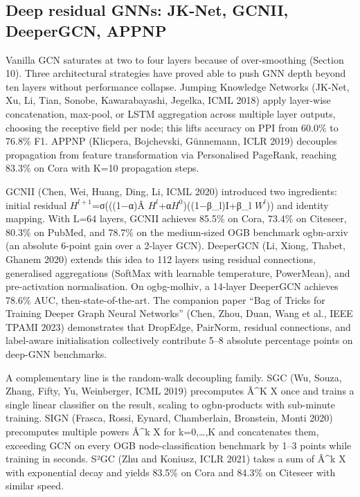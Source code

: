 \subsection{Deep residual GNNs: JK-Net, GCNII, DeeperGCN, APPNP}\label{deep-residual-gnns-jk-net-gcnii-deepergcn-appnp}

Vanilla GCN saturates at two to four layers because of over-smoothing (Section 10). Three architectural strategies have proved able to push GNN depth beyond ten layers without performance collapse. Jumping Knowledge Networks (JK-Net, Xu, Li, Tian, Sonobe, Kawarabayashi, Jegelka, ICML 2018) apply layer-wise concatenation, max-pool, or LSTM aggregation across multiple layer outputs, choosing the receptive field per node; this lifts accuracy on PPI from 60.0\% to 76.8\% F1. APPNP (Klicpera, Bojchevski, Günnemann, ICLR 2019) decouples propagation from feature transformation via Personalised PageRank, reaching 83.3\% on Cora with K=10 propagation steps.

GCNII (Chen, Wei, Huang, Ding, Li, ICML 2020) introduced two ingredients: initial residual \(H^{l+1}\)=σ(((1−α)Â \(H^l\)+α\(H^0\))((1−β\_l)I+β\_l \(W^l\))) and identity mapping. With L=64 layers, GCNII achieves 85.5\% on Cora, 73.4\% on Citeseer, 80.3\% on PubMed, and 78.7\% on the medium-sized OGB benchmark ogbn-arxiv (an absolute 6-point gain over a 2-layer GCN). DeeperGCN (Li, Xiong, Thabet, Ghanem 2020) extends this idea to 112 layers using residual connections, generalised aggregations (SoftMax with learnable temperature, PowerMean), and pre-activation normalisation. On ogbg-molhiv, a 14-layer DeeperGCN achieves 78.6\% AUC, then-state-of-the-art. The companion paper ``Bag of Tricks for Training Deeper Graph Neural Networks'' (Chen, Zhou, Duan, Wang et al., IEEE TPAMI 2023) demonstrates that DropEdge, PairNorm, residual connections, and label-aware initialisation collectively contribute 5--8 absolute percentage points on deep-GNN benchmarks.

A complementary line is the random-walk decoupling family. SGC (Wu, Souza, Zhang, Fifty, Yu, Weinberger, ICML 2019) precomputes Â\^{}K X once and trains a single linear classifier on the result, scaling to ogbn-products with sub-minute training. SIGN (Frasca, Rossi, Eynard, Chamberlain, Bronstein, Monti 2020) precomputes multiple powers Â\^{}k X for k=0,\ldots,K and concatenates them, exceeding GCN on every OGB node-classification benchmark by 1--3 points while training in seconds. S²GC (Zhu and Koniusz, ICLR 2021) takes a sum of Â\^{}k X with exponential decay and yields 83.5\% on Cora and 84.3\% on Citeseer with similar speed.

